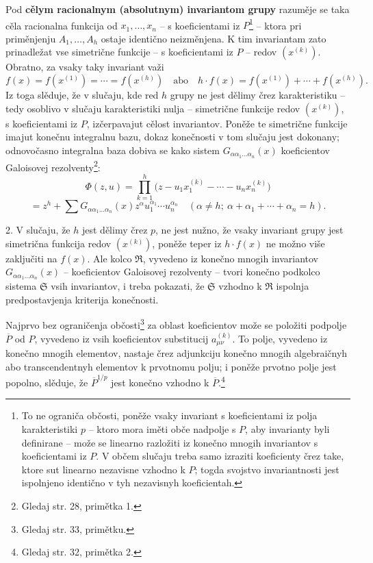 \documentclass[11pt]{article}
\begin{document}
Pod \textbf{cělym racionalnym (absolutnym) invariantom grupy} razuměje se taka cěla racionalna funkcija od $x_1,\ldots,x_n$ -- s koeficientami iz $P$\footnote{To ne ograniča občosti, poněže vsaky invariant s koeficientami iz polja karakteristiki $p$ -- ktoro mora iměti obče nadpolje s $P$, aby invarianty byli definirane -- može se linearno razložiti iz konečno mnogih invariantov s koeficientami iz $P$. V občem slučaju treba samo izraziti koeficienty črez take, ktore sut linearno nezavisne vzhodno k $P$; togda svojstvo invariantnosti jest ispolnjeno identično v tyh nezavisnyh koeficientah.} -- ktora pri priměnjenju $A_1,\ldots,A_h$ ostaje identično neizměnjena. K tim invariantam zato prinadležat vse simetrične funkcije -- s koeficientami iz $P$ -- redov $(x^{(k)})$. Obratno, za vsaky taky invariant važi
\[
 f(x)=f(x^{(1)})=\cdots=f(x^{(h)})
 \quad\text{abo}\quad
 h\cdot f(x)=f(x^{(1)})+\cdots+f(x^{(h)}).
\]
Iz toga slěduje, že v slučaju, kde red $h$ grupy ne jest dělimy črez karakteristiku -- tedy osoblivo v slučaju karakteristiki nulja -- simetrične funkcije redov $(x^{(k)})$, s koeficientami iz $P$, izčerpavajut cělost invariantov. Poněže te simetrične funkcije imajut konečnu integralnu bazu, dokaz konečnosti v tom slučaju jest dokonany; odnovočasno integralna baza dobiva se kako sistem $G_{\alpha\alpha_1\ldots\alpha_n}(x)$ koeficientov Galoisovej rezolventy\footnote{Gledaj str. 28, primětka 1.}:
\[
 \Phi(z,u)=\prod_{k=1}^{h}\bigl(z-u_1x_1^{(k)}-\cdots-u_nx_n^{(k)}\bigr)
\]
\[
 =z^h+\sum G_{\alpha\alpha_1\ldots\alpha_n}(x)
 z^{\alpha}u_1^{\alpha_1}\cdots u_n^{\alpha_n}
 \quad(\alpha\ne h;\ \alpha+\alpha_1+\cdots+\alpha_n=h).
\]

2. V slučaju, že $h$ jest dělimy črez $p$, ne jest nužno, že vsaky invariant grupy jest simetrična funkcija redov $(x^{(k)})$, poněže teper iz $h\cdot f(x)$ ne možno više zaključiti na $f(x)$. Ale kolco $\mathfrak R$, vyvedeno iz konečno mnogih invariantov $G_{\alpha\alpha_1\ldots\alpha_n}(x)$ -- koeficientov Galoisovej rezolventy -- tvori konečno podkolco sistema $\mathfrak S$ vsih invariantov, i treba pokazati, že $\mathfrak S$ vzhodno k $\mathfrak R$ ispolnja predpostavjenja kriterija konečnosti.

Najprvo bez ograničenja občosti\footnote{Gledaj str. 33, primětku.} za oblast koeficientov može se položiti podpolje $\overline P$ od $P$, vyvedeno iz vsih koeficientov substitucij $a_{\mu\nu}^{(k)}$. To polje, vyvedeno iz konečno mnogih elementov, nastaje črez adjunkciju konečno mnogih algebraičnyh abo transcendentnyh elementov k prvotnomu polju; i poněže prvotno polje jest popolno, slěduje, že $\overline P^{1/p}$ jest konečno vzhodno k $\overline P$.\footnote{Gledaj str. 32, primětka 2.}
\end{document}
